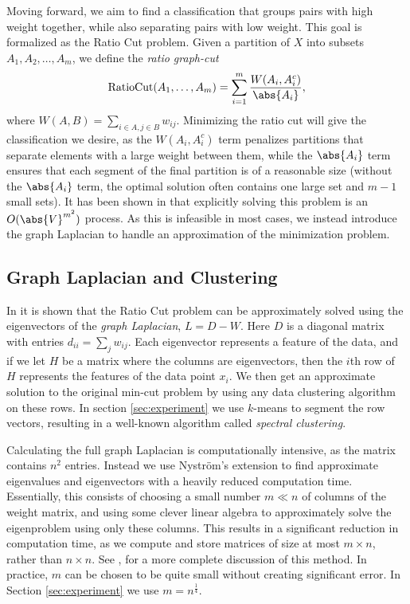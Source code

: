 \documentclass{article}[11pt]
\begin{document}
Moving forward, we aim to find a classification that groups pairs with high
weight together, while also separating pairs with low weight.  This goal is
formalized as the Ratio Cut problem. Given a partition of $X$ into subsets
$A_1,A_2,\ldots,A_m$, we define the \emph{ratio graph-cut}
\[\text{RatioCut}(A_1,\ldots,A_m) = \sum_{i=1}^m
  \frac{W(A_i,A_i^c)}{\abs{A_i}},\] where
$W(A,B) = \sum_{i\in A, j\in B}w_{ij}.$ Minimizing the ratio cut will give the
classification we desire, as the $W(A_i,A_i^c)$ term penalizes partitions that
separate elements with a large weight between them, while the $\abs{A_i}$ term
ensures that each segment of the final partition is of a reasonable size
(without the $\abs{A_i}$ term, the optimal solution often contains one large set
and $m-1$ small sets). It has been shown in \cite{Goldschmidt94} that explicitly
solving this problem is an $O(\abs{V}^{m^2})$ process. As this is infeasible in
most cases, we instead introduce the graph Laplacian to handle an approximation
of the minimization problem.

\subsection{Graph Laplacian and Clustering} \label{subsec:graphLaplacian} In
\cite{Mohar91} it is shown that the Ratio Cut problem can be approximately
solved using the eigenvectors of the \emph{graph Laplacian}, $L = D - W$. Here
$D$ is a diagonal matrix with entries $d_{ii}=\sum_j w_{ij}$.  Each eigenvector
represents a feature of the data, and if we let $H$ be a matrix where the
columns are eigenvectors, then the $i$th row of $H$ represents the features of
the data point $x_i$. We then get an approximate solution to the original
min-cut problem by using any data clustering algorithm on these rows. In section
\ref{sec:experiment} we use $k$-means to segment the row vectors, resulting in a
well-known algorithm called \emph{spectral clustering}.

Calculating the full graph Laplacian is computationally intensive, as the matrix
contains $n^2$ entries. Instead we use Nystr\"{o}m's extension to find
approximate eigenvalues and eigenvectors with a heavily reduced computation
time. Essentially, this consists of choosing a small number $m \ll n$ of columns
of the weight matrix, and using some clever linear algebra to approximately
solve the eigenproblem using only these columns. This results in a significant
reduction in computation time, as we compute and store matrices of size at most
$m\times n$, rather than $n\times n$. See \cite{Fowlkes04}, \cite{Merkurjev13}
for a more complete discussion of this method. In practice, $m$ can be chosen to
be quite small without creating significant error. In Section
\ref{sec:experiment} we use $m = n^{\frac{1}{4}}$.
\end{document}
